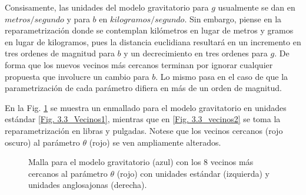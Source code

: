 Consisamente, las unidades del modelo gravitatorio para $g$ usualmente se dan en $metros/segundo$ y para $b$ en $kilogramos/segundo$. Sin embargo, piense en la reparametrización donde se contemplan kilómetros en lugar de metros y gramos en lugar de kilogramos, pues la distancia euclidiana resultará en un incremento en tres ordenes de magnitud para $b$ y un decrecimiento en tres ordenes para $g$. De forma que los nuevos vecinos más cercanos terminan por ignorar cualquier propuesta que involucre un cambio para $b$. Lo mismo pasa en el caso de que la parametrización de cada parámetro difiera en más de un orden de magnitud.

En la Fig. \ref{Vecinos} se muestra un enmallado para el modelo gravitatorio en unidades estándar \ref{Fig. 3.3_Vecinos1}, mientras que en \ref{Fig. 3.3_vecinos2} se toma la reparametrización en libras y pulgadas. Notese que los vecinos cercanos (rojo oscuro) al parámetro $\theta$ (rojo) se ven ampliamente alterados.

\begin{figure}[h]
    \centering
    \qquad
    \caption{Malla para el modelo gravitatorio (azul) con los 8 vecinos más cercanos al parámetro $\theta$ (rojo) con unidades estándar (izquierda) y unidades anglosajonas (derecha).}
    \label{Vecinos}
\end{figure}






















